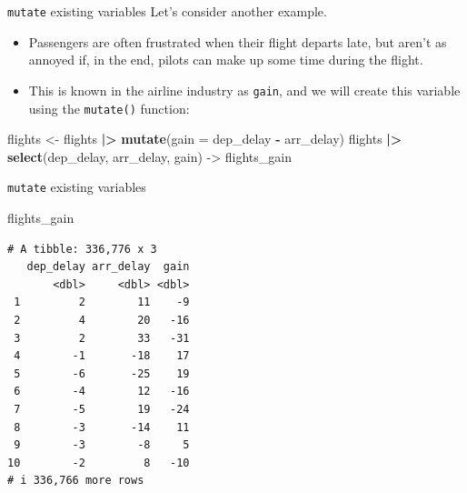 \documentclass[
  ignorenonframetext,
]{beamer}
\newenvironment{Shaded}{\begin{snugshade}}{\end{snugshade}}
\newcommand{\AttributeTok}[1]{\textcolor[rgb]{0.13,0.29,0.53}{#1}}
\newcommand{\FunctionTok}[1]{\textcolor[rgb]{0.13,0.29,0.53}{\textbf{#1}}}
\newcommand{\NormalTok}[1]{#1}
\newcommand{\OtherTok}[1]{\textcolor[rgb]{0.56,0.35,0.01}{#1}}
\newcommand{\SpecialCharTok}[1]{\textcolor[rgb]{0.81,0.36,0.00}{\textbf{#1}}}
\begin{document}
\begin{frame}[fragile]{\texttt{mutate} existing variables}
\protect\hypertarget{mutate-existing-variables-4}{}
Let's consider another example.

\begin{itemize}
\item
  Passengers are often frustrated when their flight departs late, but
  aren't as annoyed if, in the end, pilots can make up some time during
  the flight.
\item
  This is known in the airline industry as \texttt{gain}, and we will
  create this variable using the \texttt{mutate()} function:
\end{itemize}

\normalsize

\begin{Shaded}
\begin{Highlighting}[]
\NormalTok{flights }\OtherTok{\textless{}{-}}\NormalTok{ flights }\SpecialCharTok{|\textgreater{}} 
  \FunctionTok{mutate}\NormalTok{(}\AttributeTok{gain =}\NormalTok{ dep\_delay }\SpecialCharTok{{-}}\NormalTok{ arr\_delay)}
\NormalTok{flights  }\SpecialCharTok{|\textgreater{}} 
  \FunctionTok{select}\NormalTok{(dep\_delay, arr\_delay, gain) }\OtherTok{{-}\textgreater{}}\NormalTok{ flights\_gain}
\end{Highlighting}
\end{Shaded}

\normalsize
\end{frame}

\begin{frame}[fragile]{\texttt{mutate} existing variables}
\protect\hypertarget{mutate-existing-variables-5}{}
\begin{Shaded}
\begin{Highlighting}[]
\NormalTok{flights\_gain}
\end{Highlighting}
\end{Shaded}

\begin{verbatim}
# A tibble: 336,776 x 3
   dep_delay arr_delay  gain
       <dbl>     <dbl> <dbl>
 1         2        11    -9
 2         4        20   -16
 3         2        33   -31
 4        -1       -18    17
 5        -6       -25    19
 6        -4        12   -16
 7        -5        19   -24
 8        -3       -14    11
 9        -3        -8     5
10        -2         8   -10
# i 336,766 more rows
\end{verbatim}
\end{frame}
\end{document}
